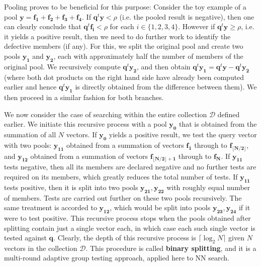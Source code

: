 \documentclass[sigconf, anonymous, review]{acmart}
\begin{document}
Pooling proves to be beneficial for this purpose: Consider the toy example of a pool $\boldsymbol{y} = \boldsymbol{f_1} + \boldsymbol{f_2} + \boldsymbol{f_3} + \boldsymbol{f_4}$. If $\boldsymbol{q}^t \boldsymbol{y} < \rho$ (i.e. the pooled result is negative), then one can clearly conclude that $\boldsymbol{q}^t \boldsymbol{f_i} < \rho$ for each $i \in \{1,2,3,4\}$. However if  $\boldsymbol{q}^t \boldsymbol{y} \geq \rho$, i.e. it yields a positive result, then we need to do further work to identify the defective members (if any). For this, we split the original pool and create two pools $\boldsymbol{y_1}$ and $\boldsymbol{y_2}$, each with approximately half the number of members of the original pool. We recursively compute $\boldsymbol{q}^t \boldsymbol{y_2}$, and then obtain $\boldsymbol{q}^t \boldsymbol{y_1} = \boldsymbol{q}^t \boldsymbol{y} - \boldsymbol{q}^t \boldsymbol{y_2}$ (where both dot products on the right hand side have already been computed earlier and hence $\boldsymbol{q}^t \boldsymbol{y_1}$ is directly obtained from the difference between them). We then proceed in a similar fashion for both branches. 

We now consider the case of searching within the entire collection $\mathcal{D}$ defined earlier. We initiate this recursive process with a pool $\boldsymbol{y_0}$ that is obtained from the summation of all $N$ vectors. If $\boldsymbol{y_0}$ yields 
a positive result, we test the query vector with two pools: $\boldsymbol{y_{11}}$ obtained from a summation of vectors $\boldsymbol{f_1}$ through to $\boldsymbol{f_{\lfloor N/2 \rfloor}}$, and $\boldsymbol{y_{12}}$ obtained from a summation of vectors $\boldsymbol{f_{\lfloor N/2 \rfloor+1}}$ through to $\boldsymbol{f_N}$. If $\boldsymbol{y_{11}}$ tests negative, then all its members are declared negative and no further tests are required on its members, which greatly reduces the total number of tests. If $\boldsymbol{y_{11}}$ tests positive, then it is split into two pools 
$\boldsymbol{y_{21}}, \boldsymbol{y_{22}}$ with roughly equal number of members. Tests are carried out further on these two pools recursively. The same treatment is accorded to $\boldsymbol{y_{12}}$, which would be split into pools $\boldsymbol{y_{23}}, \boldsymbol{y_{24}}$ if it were to test positive. This recursive process stops when the pools obtained after splitting contain just a single vector each, in which case each such single vector is tested against $\boldsymbol{q}$. Clearly, the depth of this recursive process is $\lceil \log_2 N \rceil$ given $N$ vectors in the collection $\mathcal{D}$. This procedure is called \textbf{binary splitting}, and it is a multi-round adaptive group testing approach, applied here to NN search. 
\end{document}
